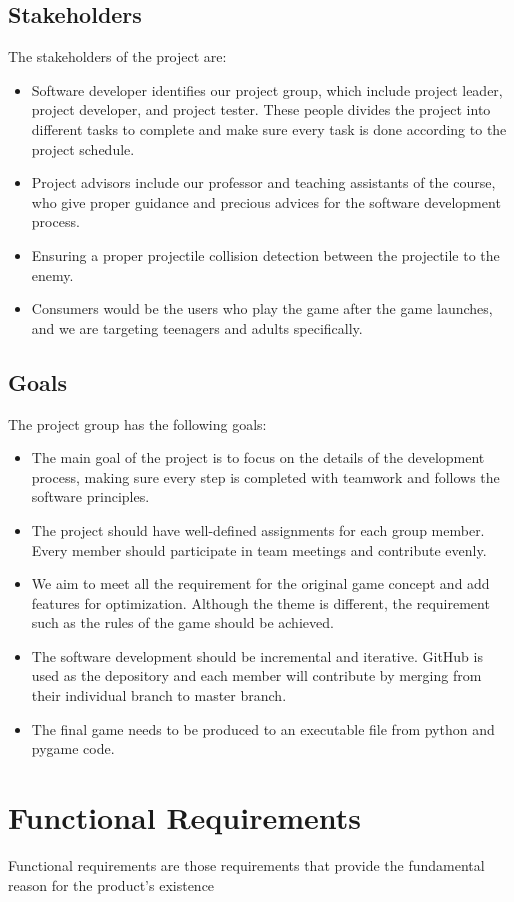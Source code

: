 \documentclass{article}
\begin{document}
\subsection{Stakeholders}
The stakeholders of the project are:
\begin{itemize}
    \item Software developer identifies our project group, which include project leader, project developer, and project tester. These people divides the project into different tasks to complete and make sure every task is done according to the project schedule.
    \item Project advisors include our professor and teaching assistants of the course, who give proper guidance and precious advices for the software development process.
    \item Ensuring a proper projectile collision detection between the projectile to the enemy.
    \item Consumers would be the users who play the game after the game launches, and we are targeting teenagers and adults specifically.
\end{itemize}

\subsection{Goals}
The project group has the following goals:
\begin{itemize}
    \item The main goal of the project is to focus on the details of the development process, making sure every step is completed with teamwork and follows the software principles.
    \item The project should have well-defined assignments for each group member. Every member should participate in team meetings and contribute evenly.
    \item We aim to meet all the requirement for the original game concept and add features for optimization. Although the theme is different, the requirement such as the rules of the game should be achieved.
    \item The software development should be incremental and iterative. GitHub is used as the depository and each member will contribute by merging from their individual branch to master branch.
    \item The final game needs to be produced to an executable file from python and pygame code.
\end{itemize}
\newpage
\section{Functional Requirements}
Functional requirements are those requirements that provide the fundamental reason for the product's existence
\end{document}
